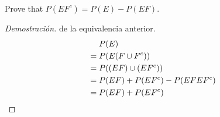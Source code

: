 \item Prove that $P(EF^c) = P(E) - P(EF)$.

\begin{proof}[Demostraci\'on] de la equivalencia anterior.
    \begin{align*}
        &\phantom{{}={}} P(E)\\
        &= P(E(F\cup F^c))\\
        &= P((EF)\cup (EF^c))\\
        &= P(EF) + P(EF^c) - P(EFEF^c)\\
        &= P(EF) + P(EF^c) \qedhere
    \end{align*}
\end{proof}
